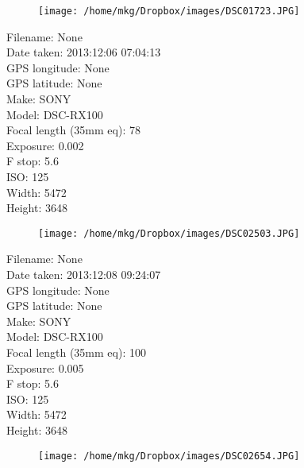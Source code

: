 \clearpage
\recalctypearea
\newpage
\noindent
\begin{figure}
    \texttt{[image: /home/mkg/Dropbox/images/DSC01723.JPG]}
\end{figure}

\clearpage
\recalctypearea
\newpage
\noindent
Filename: None\\ 
Date taken: 2013:12:06 07:04:13\\ 
GPS longitude: None\\ 
GPS latitude: None\\ 
Make: SONY\\ 
Model: DSC-RX100\\ 
Focal length (35mm eq): 78\\ 
Exposure: 0.002\\ 
F stop: 5.6\\ 
ISO: 125\\ 
Width: 5472\\ 
Height: 3648\\ 

\clearpage
\recalctypearea
\newpage
\noindent
\begin{figure}
    \texttt{[image: /home/mkg/Dropbox/images/DSC02503.JPG]}
\end{figure}

\clearpage
\recalctypearea
\newpage
\noindent
Filename: None\\ 
Date taken: 2013:12:08 09:24:07\\ 
GPS longitude: None\\ 
GPS latitude: None\\ 
Make: SONY\\ 
Model: DSC-RX100\\ 
Focal length (35mm eq): 100\\ 
Exposure: 0.005\\ 
F stop: 5.6\\ 
ISO: 125\\ 
Width: 5472\\ 
Height: 3648\\ 

\clearpage
\recalctypearea
\newpage
\noindent
\begin{figure}
    \texttt{[image: /home/mkg/Dropbox/images/DSC02654.JPG]}
    \captionlistentry[figure]{\url{\protect\detokenize{}}}
\end{figure}


